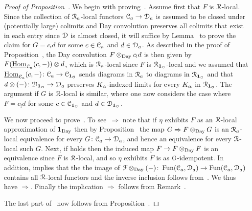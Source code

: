 \begin{proof}[Proof of Proposition~]
We begin with proving~. Assume first that $F$ is $\mathcal{R}$-local.
Since the collection of $\mathcal{R}_a$-local functors $\mathcal C_a \to \mathcal{D}_a$ is assumed to be closed under (potentially large) colimits and Day convolution preserves all colimits that exist in each entry since $\mathcal{D}$ is almost closed, it will suffice by Lemma~ to prove the claim for $G  = c_!d$ for some $c \in \mathcal C_a$ and $d \in \mathcal{D}_a$. As described in the proof of Proposition~,
the Day convolution $F \otimes_{\mathrm{Day}} c_!d$ is then given by $F(\uline{\Hom}_{\C_a}(c,-)) \otimes d$, which is $\mathcal{R}_a$-local since $F$ is $\mathcal{R}_{\mathbf{1}_{\mathcal{O}}}$-local and we assumed that $\uline{\Hom}_{\C_a}(c,-)\colon \C_a \to \C_{\one_{\cO}}$ sends diagrams in $\mathcal{R}_a$ to diagrams in $\mathcal{R}_{\mathbf{1}_{\mathcal{O}}}$ and that $d \otimes(-)\colon \mathcal{D}_{\mathbf{1}_{\mathcal{O}}} \to \mathcal{D}_a$ preserves $K_{\alpha}$-indexed limits for every $K_{\alpha}$ in $\mathcal{R}_{\mathbf{1}_{\mathcal{O}}}$. The argument if $G$ is $\mathcal{R}$-local is similar, where one now considers the case where $F=c_!d$ for some $c \in \mathcal C_{\mathbf{1}_{\mathcal{O}}}$ and $d \in \mathcal{D}_{\mathbf{1}_{\mathcal{O}}}$.

We now proceed to prove~. To see~$\Rightarrow$ note that if $\eta$ exhibits $F$ as an $\mathcal{R}$-local approximation of $\mathbf{1}_{\mathrm{Day}}$ then by Proposition~ the map $G \Rightarrow F \otimes_{\mathrm{Day}} G$ is an $\mathcal{R}_a$-local equivalence for every $G\colon \mathcal C_a \to \mathcal{D}_a$, and hence an equivalence for every $\mathcal{R}$-local such $G$. Next, if  holds then the induced map $F \to F\otimes_{\mathrm{Day}} F$ is an equivalence since $F$ is $\mathcal{R}$-local, and so $\eta$ exhibits $F$ is as $\mathcal{O}$-idempotent. In addition,  implies that the the image of $\mathcal{F}\otimes_{\mathrm{Day}}(-)\colon \operatorname{Fun}(\mathcal C_a,\mathcal{D}_a) \to \operatorname{Fun}(\mathcal C_a,\mathcal{D}_a)$ contains all $\mathcal{R}$-local functors and the inverse inclusion follows from~. We thus have $\Rightarrow$. Finally the implication $\Rightarrow$ follows from Remark~.

The last part of~ now follows from Proposition~.
\end{proof}




